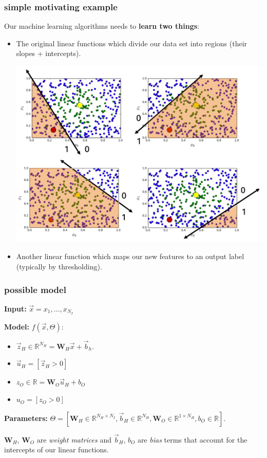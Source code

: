 \documentclass[handout,compress]{beamer}
\newcommand{\bv}[1]{\mathbf{#1}}
\newcommand{\R}{\mathbb{R}}
\begin{document}
\begin{frame}
	\frametitle{simple motivating example}
	Our machine learning algorithms needs to \textbf{learn two things}:
	\begin{itemize}
		\item The original linear functions which divide our data set into regions (their slopes + intercepts).
		\begin{center}\includegraphics[width=.4\textwidth]{sep_more_formal.png}\end{center}
		\item Another linear function which maps our new features to an output label (typically by thresholding).
	\end{itemize}
	
\end{frame}

\begin{frame}
	\frametitle{possible model}
	\textbf{Input:} $\vec{x} = x_1, \ldots, x_{N_I}$
	
	\textbf{Model:} $f(\vec{x}, \Theta)$:
	\begin{itemize}
		\item $\vec{z}_H\in \R^{N_H} = \bv{W}_H\vec{x} + \vec{b}_h$.
		\item $\vec{u}_H = [\vec{z}_H > 0]$ 
		\item $z_O \in \R = \bv{W}_O\vec{u}_H + b_O$
		\item ${u}_O = [{z}_O > 0]$
	\end{itemize}

	\textbf{Parameters:} $\Theta = [\bv{W}_H\in \R^{N_H\times N_I}, \vec{b}_H\in \R^{N_H} , \bv{W}_O\in \R^{1\times N_H}, {b}_O\in \R]$.
	
	\begin{center}
		$\bv{W}_H$, $\bv{W}_O$ are \emph{weight matrices} and $\vec{b}_H$, ${b}_O$ are \emph{bias} terms that account for the intercepts of our linear functions.  
	\end{center}
\end{frame}
\end{document}
